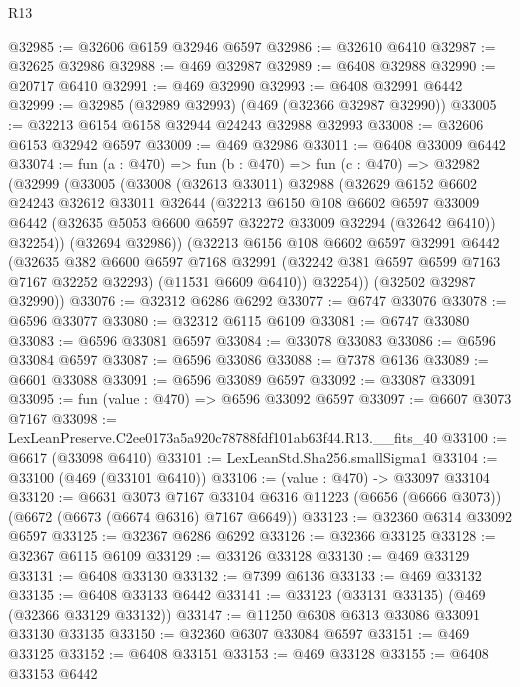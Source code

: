 \begin{lexlean}{R13}
\begin{coremodule}
@32985 := @32606 @6159 @32946 @6597
@32986 := @32610 @6410
@32987 := @32625 @32986
@32988 := @469 @32987
@32989 := @6408 @32988
@32990 := @20717 @6410
@32991 := @469 @32990
@32993 := @6408 @32991 @6442
@32999 := @32985 (@32989 @32993) (@469 (@32366 @32987 @32990))
@33005 := @32213 @6154 @6158 @32944 @24243 @32988 @32993
@33008 := @32606 @6153 @32942 @6597
@33009 := @469 @32986
@33011 := @6408 @33009 @6442
@33074 := fun (a : @470) =>
  fun (b : @470) =>
  fun (c : @470) =>
  @32982
    (@32999
      (@33005
        (@33008
          (@32613 @33011)
          @32988
          (@32629
            @6152
            @6602
            @24243
            @32612
            @33011
            @32644
            (@32213
              @6150
              @108
              @6602
              @6597
              @33009
              @6442
              (@32635 @5053 @6600 @6597 @32272 @33009 @32294 (@32642 @6410))
              @32254))
          (@32694 @32986))
        (@32213
          @6156
          @108
          @6602
          @6597
          @32991
          @6442
          (@32635
            @382
            @6600
            @6597
            @7168
            @32991
            (@32242 @381 @6597 @6599 @7163 @7167 @32252 @32293)
            (@11531 @6609 @6410))
          @32254))
      (@32502 @32987 @32990))
@33076 := @32312 @6286 @6292
@33077 := @6747 @33076
@33078 := @6596 @33077
@33080 := @32312 @6115 @6109
@33081 := @6747 @33080
@33083 := @6596 @33081 @6597
@33084 := @33078 @33083
@33086 := @6596 @33084 @6597
@33087 := @6596 @33086
@33088 := @7378 @6136
@33089 := @6601 @33088
@33091 := @6596 @33089 @6597
@33092 := @33087 @33091
@33095 := fun (value : @470) => @6596 @33092 @6597
@33097 := @6607 @3073 @7167
@33098 := LexLeanPreserve.C2ee0173a5a920c78788fdf101ab63f44.R13.__fits_40
@33100 := @6617 (@33098 @6410)
@33101 := LexLeanStd.Sha256.smallSigma1
@33104 := @33100 (@469 (@33101 @6410))
@33106 := (value : @470) -> @33097 @33104
@33120 := @6631
    @3073
    @7167
    @33104
    @6316
    @11223
    (@6656 (@6666 @3073))
    (@6672 (@6673 (@6674 @6316) @7167 @6649))
@33123 := @32360 @6314 @33092 @6597
@33125 := @32367 @6286 @6292
@33126 := @32366 @33125
@33128 := @32367 @6115 @6109
@33129 := @33126 @33128
@33130 := @469 @33129
@33131 := @6408 @33130
@33132 := @7399 @6136
@33133 := @469 @33132
@33135 := @6408 @33133 @6442
@33141 := @33123 (@33131 @33135) (@469 (@32366 @33129 @33132))
@33147 := @11250 @6308 @6313 @33086 @33091 @33130 @33135
@33150 := @32360 @6307 @33084 @6597
@33151 := @469 @33125
@33152 := @6408 @33151
@33153 := @469 @33128
@33155 := @6408 @33153 @6442

\end{coremodule}
\end{lexlean}
